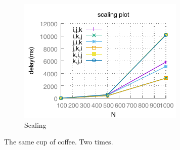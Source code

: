\documentclass{article}
\begin{document}
\begin{figure}[h!]
\begin{subfigure}[b]{0.4\linewidth}
          \includegraphics[width=\linewidth]{matrix_scaling.pdf}
          \caption{Scaling}
        \end{subfigure}
        \caption{The same cup of coffee. Two times.}
        \label{fig:coffee}
    \end{figure}
\end{document}
